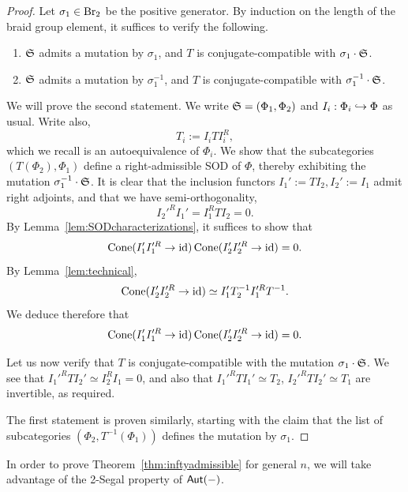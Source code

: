 \begin{proof}
    Let $\sigma_1\in\operatorname{Br}_2$ be the positive generator. By induction on the length of the braid group element, it suffices to verify the following.
    \begin{enumerate}
        \item $\mathfrak{S}$ admits a mutation by $\sigma_1$, and $T$ is conjugate-compatible with $\sigma_1\cdot\mathfrak{S}$.
        \item $\mathfrak{S}$ admits a mutation by $\sigma_1^{-1}$, and $T$ is conjugate-compatible with $\sigma_1^{-1}\cdot\mathfrak{S}$.
    \end{enumerate}

    We will prove the second statement. We write $\mathfrak{S}=(\Phi_1,\Phi_2)$ and $I_i:\Phi_i\hookrightarrow\Phi$ as usual. Write also,
    \[T_i := I_iTI_i^R,\]
    which we recall is an autoequivalence of $\Phi_i$. We show that the subcategories $(T(\Phi_2),\Phi_1)$ define a right-admissible SOD of $\Phi$, thereby exhibiting the mutation $\sigma_1^{-1}\cdot\mathfrak{S}$. It is clear that the inclusion functors $I_1' := TI_2, I_2' := I_1$ admit right adjoints, and that we have semi-orthogonality,
    \[I_2'^{R}I_1' = I_1^RTI_2=0.\]
    By Lemma~\ref{lem:SODcharacterizations}, it suffices to show that
    \[\operatorname{Cone}(I_1'I_1'^{R}\to \operatorname{id})\operatorname{Cone}(I_2'I_2'^{R}\to \operatorname{id})=0.\]
    By Lemma~\ref{lem:technical},
    \[\operatorname{Cone}(I_2'I_2'^{R}\to \operatorname{id})\simeq I_1'T_2^{-1}I_1'^RT^{-1}.\]
    We deduce therefore that
    \[\operatorname{Cone}(I_1'I_1'^{R}\to \operatorname{id})\operatorname{Cone}(I_2'I_2'^{R}\to \operatorname{id}) = 0.\]

    Let us now verify that $T$ is conjugate-compatible with the mutation $\sigma_1\cdot\mathfrak{S}$. We see that $I_1'^RTI_2' \simeq I_2^RI_1=0$, and also that $I_1'^RTI_1' \simeq T_2$, $I_2'^RTI_2' \simeq T_1$ are invertible, as required.

    The first statement is proven similarly, starting with the claim that the list of subcategories $(\Phi_2,T^{-1}(\Phi_1))$ defines the mutation by $\sigma_1$.
\end{proof}

In order to prove Theorem~\ref{thm:inftyadmissible} for general $n$, we will take advantage of the 2-Segal property of $\mathsf{Aut}(-)$.

